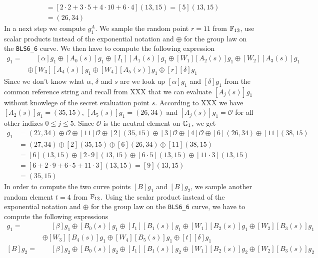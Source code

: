 \begin{example}
\begin{align*}
      & = [2\cdot 2+ 3\cdot 5+4\cdot 10+ 6\cdot 4](13,15) = [5](13,15)\\
      & = (26,34)
\end{align*} 
In a next step we compute $g_1^A$. We sample the random point $r=11$ from $\mathbb{F}_{13}$, use scalar products instead of the exponential notation and $\oplus$ for the group law on the \texttt{BLS6\_6} curve. We then have to compute the following expression
\begin{align*}
[A]g_1 = &\phantom{\oplus} [\alpha]g_1 \oplus [A_0(s)]g_1 \oplus [I_1][A_1(s)]g_1\oplus [W_1][A_2(s)]g_1 \oplus [W_2][A_3(s)]g_1\\ 
       & \oplus [W_3][A_4(s)]g_1\oplus [W_4][A_5(s)]g_1\oplus [r][\delta]g_1
\end{align*}
Since we don't know what $\alpha$, $\delta$ and $s$ are we look up $[\alpha]g_1$ and $[\delta]g_1$ from the common reference string and recall from XXX that we can evaluate $[A_j(s)]g_1$ without knowlege of the secret evaluation point $s$. According to XXX we have $[A_2(s)]g_1=(35,15)$, $[A_5(s)]g_1=(26,34)$ and $[A_j(s)]g_1=\mathcal{O}$ for all other indizes $0\leq j\leq 5$. Since $\mathcal{O}$ is the neutral element on $\mathbb{G}_1$, we get  
\begin{align*}
[A]g_1 &= (27,34) \oplus \mathcal{O} \oplus [11]\mathcal{O}\oplus [2](35,15) \oplus [3]\mathcal{O} \oplus [4]\mathcal{O}\oplus [6](26,34)\oplus [11](38,15)\\
 &=  (27,34)\oplus [2](35,15)\oplus [6](26,34)\oplus [11](38,15)\\
 &=  [6](13,15)\oplus [2\cdot 9](13,15)\oplus [6\cdot 5](13,15)\oplus [11\cdot 3](13,15)\\ 
 &=  [6+ 2\cdot 9+ 6\cdot 5+ 11\cdot 3](13,15) = [9](13,15)\\
 &= (35,15)
\end{align*}
In order to compute the two curve points $[B]g_1$ and $[B]g_2$, we sample another random element $t=4$ from $\mathbb{F}_{13}$. Using the scalar product instead of the exponential notation and $\oplus$ for the group law on the \texttt{BLS6\_6} curve, we  have to compute the following expressions
\begin{align*}
[B]g_1 = &\phantom{\oplus} [\beta]g_1 \oplus [B_0(s)]g_1 \oplus [I_1][B_1(s)]g_1\oplus [W_1][B_2(s)]g_1 \oplus [W_2][B_3(s)]g_1\\ 
       & \oplus [W_3][B_4(s)]g_1\oplus [W_4][B_5(s)]g_1\oplus [t][\delta]g_1\\
[B]g_2 = &\phantom{\oplus} [\beta]g_2 \oplus [B_0(s)]g_2 \oplus [I_1][B_1(s)]g_2\oplus [W_1][B_2(s)]g_2 \oplus [W_2][B_3(s)]g_2\\ 

\end{align*}
\end{example}

